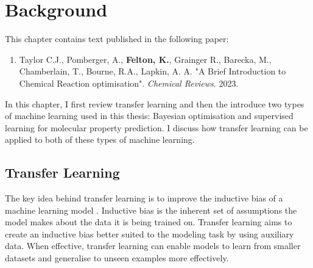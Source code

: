 \chapter{Background}\label{ch:background}

This chapter contains text published in the following paper:

\begin{enumerate}
\item Taylor C.J., Pomberger, A., \textbf{Felton, K.}, Grainger R., Barecka, M., Chamberlain, T., Bourne, R.A., Lapkin, A. A. "A Brief Introduction to Chemical Reaction optimisation". \textit{Chemical Reviews}. 2023.
\end{enumerate}

In this chapter, I first review transfer learning and then the introduce two types of machine learning used in this thesis: Bayesian optimisation and supervised learning for molecular property prediction. I discuss how transfer learning can be applied to both of these types of machine learning.

\section{Transfer Learning}

The key idea behind transfer learning is to improve the inductive bias of a machine learning model \cite{Zhuang2021}. Inductive bias is the inherent set of assumptions the model makes about the data it is being trained on. Transfer learning aims to create an inductive bias better suited to the modeling task by using auxiliary data. When effective, transfer learning can enable models to learn from smaller datasets and generalise to unseen examples more effectively. 

